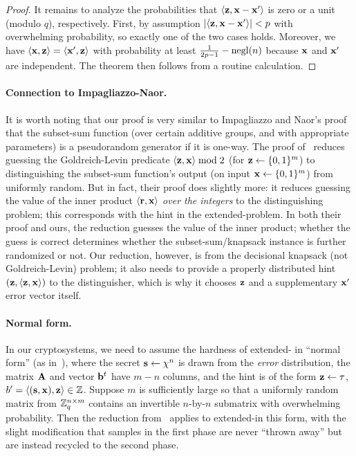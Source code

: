 \begin{proof}
  It remains to analyze the probabilities that $\langle{\ensuremath{\mathbf{z}},
    \ensuremath{\mathbf{x}}-\ensuremath{\mathbf{x}}'}\rangle$ is zero or a unit (modulo $q$), respectively.
  First, by assumption $\lvert{\langle{\ensuremath{\mathbf{z}}, \ensuremath{\mathbf{x}}-\ensuremath{\mathbf{x}}'}\rangle}\rvert < p$ with
  overwhelming probability, so exactly one of the two cases holds.
  Moreover, we have $\langle{\ensuremath{\mathbf{x}}, \ensuremath{\mathbf{z}}}\rangle = \langle{\ensuremath{\mathbf{x}}',\ensuremath{\mathbf{z}}}\rangle$ with
  probability at least $\frac{1}{2p-1} - \operatorname{negl}(n)$ because $\mathbf{x}$ and
  $\mathbf{x}'$ are independent.  The theorem then follows from a routine
  calculation.
\end{proof}

\paragraph{Connection to Impagliazzo-Naor.} 

It is worth noting that our proof is very similar to Impagliazzo and
Naor's proof~\cite{DBLP:journals/joc/ImpagliazzoN96} that the
subset-sum function (over certain additive groups, and with
appropriate parameters) is a pseudorandom generator if it is one-way.
The proof of~\cite{DBLP:journals/joc/ImpagliazzoN96} reduces guessing
the Goldreich-Levin predicate $\langle{\ensuremath{\mathbf{z}},\ensuremath{\mathbf{x}}}\rangle \bmod 2$ (for
$\mathbf{z} \gets \{{0,1}\}^{m}$) to distinguishing the subset-sum function's
output (on input $\mathbf{x} \gets \{{0,1}\}^{m}$) from uniformly random.  But
in fact, their proof does slightly more: it reduces guessing the value
of the inner product $\langle{\ensuremath{\mathbf{r}},\ensuremath{\mathbf{x}}}\rangle$ \emph{over the integers} to
the distinguishing problem; this corresponds with the hint in the
extended-\lwe problem.  In both their proof and ours, the reduction
guesses the value of the inner product; whether the guess is correct
determines whether the subset-sum/knapsack instance is further
randomized or not.  Our reduction, however, is from the decisional
knapsack (not Goldreich-Levin) problem; it also needs to provide a
properly distributed hint $(\mathbf{z}, \langle{\ensuremath{\mathbf{z}},\ensuremath{\mathbf{x}}}\rangle)$ to the
distinguisher, which is why it chooses $\mathbf{z}$ and a supplementary
$\mathbf{x}'$ error vector itself.

\paragraph{Normal form.}

In our cryptosystems, we need to assume the hardness of extended-\lwe
in ``normal form'' (as
in~\cite{MR09:_post_quant_crypt,DBLP:conf/crypto/ApplebaumCPS09}),
where the secret $\mathbf{s} \gets \chi^{n}$ is drawn from the \emph{error}
distribution, the matrix $\mathbf{A}$ and vector $\mathbf{b}^{t}$ have $m-n$
columns, and the hint is of the form $\mathbf{z} \gets \tau$,
$b'=\langle{(\ensuremath{\mathbf{s}},\ensuremath{\mathbf{x}}), \ensuremath{\mathbf{z}}}\rangle \in \mathbb{Z}$.  Suppose $m$ is sufficiently
large so that a uniformly random matrix from $\mathbb{Z}_q^{n \times m}$
contains an invertible $n$-by-$n$ submatrix with overwhelming
probability.  Then the reduction
from~\cite{MR09:_post_quant_crypt,DBLP:conf/crypto/ApplebaumCPS09}
applies to extended-\lwe in this form, with the slight modification
that \lwe samples in the first phase are never ``thrown away'' but are
instead recycled to the second phase.

